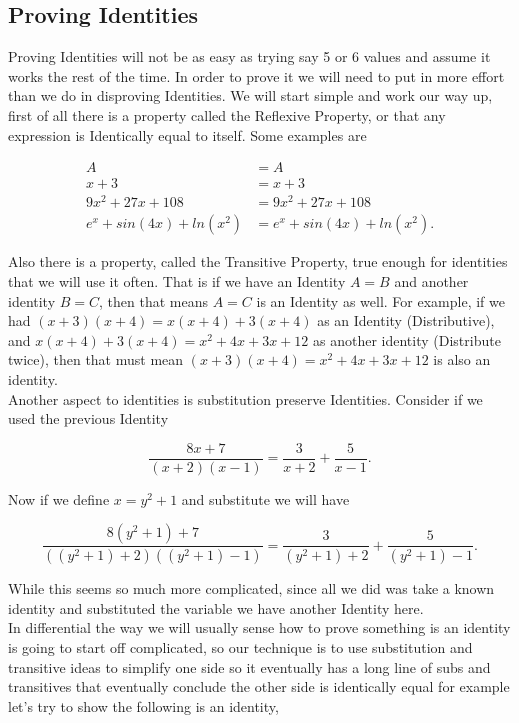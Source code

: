 \documentclass[12pt]{article}
\begin{document}
\subsection{Proving Identities}

Proving Identities will not be as easy as trying say 5 or 6 values and assume it works the rest of the time. In order to prove it we will need to put in more effort than we do in disproving Identities. We will start simple and work our way up, first of all there is a property called the Reflexive Property, or that any expression is Identically equal to itself. Some examples are

\begin{align*}
    A&=A \\
    x+3&=x+3 \\
    9x^2+27x+108&=9x^2+27x+108 \\
    e^x+sin(4x)+ln(x^2)&=e^x+sin(4x)+ln(x^2).
\end{align*}

Also there is a property, called the Transitive Property, true enough for identities that we will use it often. That is if we have an Identity $A=B$ and another identity $B=C$, then that means $A=C$ is an Identity as well. For example, if we had $(x+3)(x+4)=x(x+4)+3(x+4)$ as an Identity (Distributive), and $x(x+4)+3(x+4)=x^2+4x+3x+12$ as another identity (Distribute twice), then that must mean $(x+3)(x+4)=x^2+4x+3x+12$ is also an identity. \\

Another aspect to identities is substitution preserve Identities. Consider if we used the previous Identity

\begin{equation*}
    \frac{8x+7}{(x+2)(x-1)}=\frac{3}{x+2}+\frac{5}{x-1}.
\end{equation*}

Now if we define $x=y^2+1$ and substitute we will have

\begin{equation*}
    \frac{8(y^2+1)+7}{((y^2+1)+2)((y^2+1)-1)}=\frac{3}{(y^2+1)+2}+\frac{5}{(y^2+1)-1}.
\end{equation*}

While this seems so much more complicated, since all we did was take a known identity and substituted the variable we have another Identity here. \\

In differential the way we will usually sense how to prove something is an identity is going to start off complicated, so our technique is to use substitution and transitive ideas to simplify one side so it eventually has a long line of subs and transitives that eventually conclude the other side is identically equal for example let's try to show the following is an identity,
\end{document}

